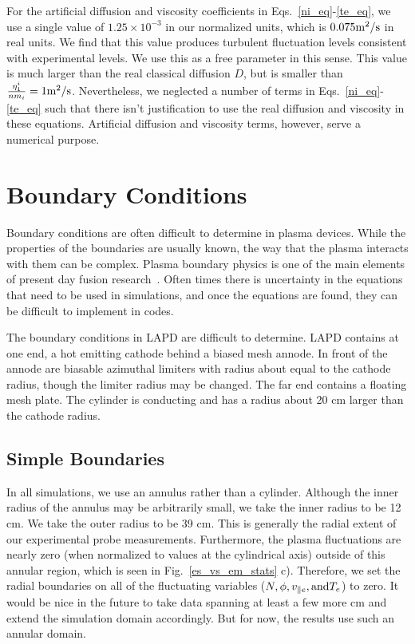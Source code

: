 For the artificial diffusion and viscosity coefficients in Eqs.~\ref{ni_eq}-\ref{te_eq}, we use a single value of $1.25 \times 10^{-3}$ in our normalized units, 
which is $0.075 {\rm m^2/s}$ in real units.
We find that this value produces turbulent fluctuation levels consistent with experimental levels. 
We use this as a free parameter in this sense. This value is much larger than the real classical diffusion $D$,
but is smaller than $\frac{\eta_1^i}{n m_i} = 1 {\rm m^2/s}$. 
Nevertheless, we neglected a number of terms in Eqs.~\ref{ni_eq}-\ref{te_eq} such that there isn't justification to use the real diffusion and 
viscosity in these equations. Artificial diffusion and viscosity terms, however, serve a numerical purpose.


\section{Boundary Conditions}
\label{s_bcs}

Boundary conditions are often difficult to determine in plasma devices. While the properties of the boundaries are usually known, the way that the plasma interacts with them can be complex.
Plasma boundary physics is one of the main elements of present day fusion research~\cite{stangeby2000}. Often times there is uncertainty in the equations that need to be used in simulations,
and once the equations are found, they can be difficult to implement in codes.

The boundary conditions in LAPD are difficult to determine. LAPD contains at one end, a hot emitting cathode behind a biased mesh annode. In front of the annode are biasable azimuthal limiters
with radius about equal to the cathode radius, though the limiter radius may be changed. The far end contains a floating mesh plate. The cylinder is conducting and has a radius about 20 cm larger
than the cathode radius.

\subsection{Simple Boundaries}
\label{ss_s_bc}

In all simulations, we use an annulus rather than a cylinder. Although the inner radius of the annulus may be arbitrarily small, we take the inner radius to be 12 cm. We take the outer radius
to be 39 cm. This is generally the radial extent of our experimental probe measurements. Furthermore, the plasma fluctuations are nearly zero (when normalized to values at the cylindrical axis)
outside of this annular
region, which is seen in Fig.~\ref{es_vs_em_stats} c). Therefore, we set the radial boundaries on all of the fluctuating variables ($N, \phi, v_{\parallel e}, {\rm and } T_e$) to zero. It would be nice
in the future to take data spanning at least a few more cm and extend the simulation domain accordingly. But for now, the results use such an annular domain.


